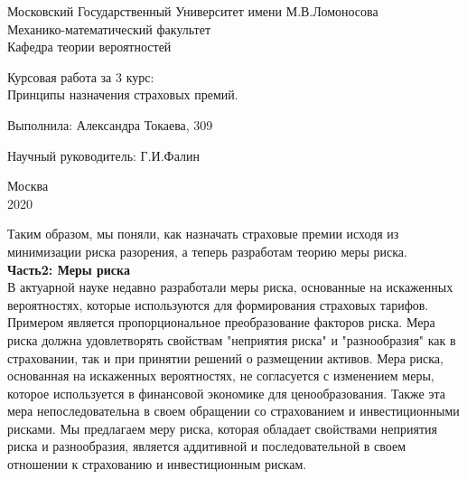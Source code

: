 \documentclass[12pt,a4paper]{article}
\begin{document}
\begin{titlepage}

 \begin{center}
 Московский Государственный Университет имени М.В.Ломоносова \\
Механико-математический факультет\\
Кафедра теории вероятностей
  \end{center}

 \vspace{3cm}
 
 \begin{center}
   
  {  Курсовая работа за 3 курс:\\
  Принципы назначения страховых премий.}
   
    \vspace{5cm}
\end{center}     
   
     
   \hspace{170pt}  {Выполнила: Александра Токаева,  309 \\}
       
 \vspace{0.1cm}
  \hspace{170pt} 	  Научный руководитель:  Г.И.Фалин\\

\vspace{4cm}

  \begin{center}
  {Москва\\
  2020}
  \end{center}  
 
 
\end{titlepage}




Таким образом, мы поняли, как назначать страховые премии исходя из минимизации риска разорения, а теперь разработам теорию меры риска.\\

{\bf \large Часть2:  Меры риска}\\


В актуарной науке недавно разработали меры риска, основанные на искаженных вероятностях, которые используются 
для формирования страховых тарифов. Примером является  пропорциональное преобразование факторов риска.
Мера риска должна удовлетворять свойствам  "неприятия риска"  и  "разнообразия" как в страховании, так и  при принятии решений о размещении активов. Мера риска, основанная на искаженных вероятностях, не согласуется с  изменением меры, которое используется в финансовой экономике для ценообразования. Также эта мера непоследовательна в своем обращении со страхованием и инвестиционными рисками.  Мы предлагаем меру риска, которая обладает свойствами неприятия риска и разнообразия, является аддитивной и  последовательной в своем отношении к страхованию и инвестиционным рискам. \\
\end{document}

